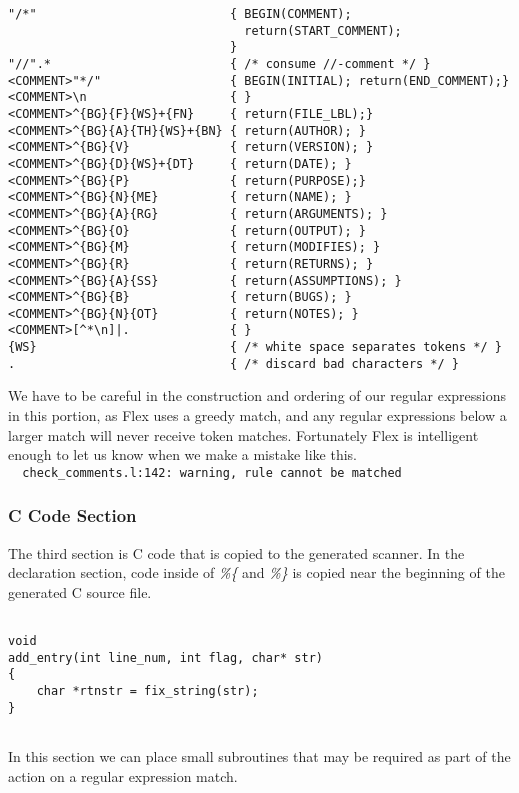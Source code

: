\begin{verbatim}
"/*"                           { BEGIN(COMMENT); 
                                 return(START_COMMENT); 
                               }
"//".*                         { /* consume //-comment */ }
<COMMENT>"*/"                  { BEGIN(INITIAL); return(END_COMMENT);}
<COMMENT>\n                    { }
<COMMENT>^{BG}{F}{WS}+{FN}     { return(FILE_LBL);}
<COMMENT>^{BG}{A}{TH}{WS}+{BN} { return(AUTHOR); }
<COMMENT>^{BG}{V}              { return(VERSION); }
<COMMENT>^{BG}{D}{WS}+{DT}     { return(DATE); }
<COMMENT>^{BG}{P}              { return(PURPOSE);}
<COMMENT>^{BG}{N}{ME}          { return(NAME); }
<COMMENT>^{BG}{A}{RG}          { return(ARGUMENTS); }
<COMMENT>^{BG}{O}              { return(OUTPUT); }
<COMMENT>^{BG}{M}              { return(MODIFIES); }
<COMMENT>^{BG}{R}              { return(RETURNS); }
<COMMENT>^{BG}{A}{SS}          { return(ASSUMPTIONS); }
<COMMENT>^{BG}{B}              { return(BUGS); }
<COMMENT>^{BG}{N}{OT}          { return(NOTES); }
<COMMENT>[^*\n]|.              { }
{WS}                           { /* white space separates tokens */ }
.                              { /* discard bad characters */ }
\end{verbatim}
\endgroup

\noindent We have to be careful in the construction and ordering of our regular 
expressions in this portion, as Flex uses a greedy match, and any regular 
expressions below a larger match will never receive token matches. Fortunately 
Flex is intelligent enough to let us know when we make a mistake like this.\\
\verb|  check_comments.l:142: warning, rule cannot be matched|

\subsubsection{C Code Section}
\noindent The third section is C code that is copied to the generated scanner.
In the declaration section, code inside of \emph{\%\{} and \emph{\%\}} is copied near the 
beginning of the generated C source file. 
\begingroup

\begin{verbatim}

void
add_entry(int line_num, int flag, char* str)
{
    char *rtnstr = fix_string(str);
}


\end{verbatim}
\endgroup
\noindent In this section we can place small subroutines that may be required
as part of the action on a regular expression match.\\

